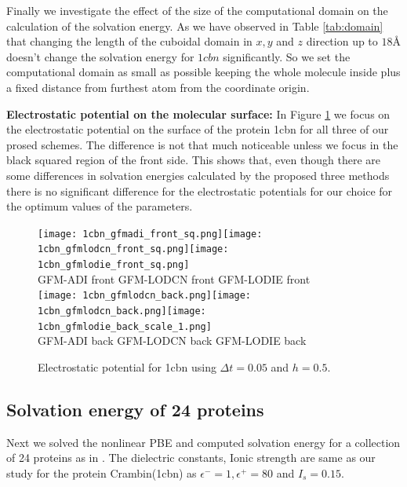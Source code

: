 Finally we investigate the effect of the size of the computational domain on the calculation of the solvation energy. As we have observed in Table \ref{tab:domain} that changing the length of the cuboidal domain in $x,y$ and $z$ direction up to $18$\r{A} doesn't change the solvation energy for $1cbn$ significantly. So we set the computational domain as small as possible keeping the whole molecule inside plus a fixed distance from furthest atom from the coordinate origin.   


{\bf Electrostatic potential on the molecular surface:} In Figure \ref{fig_1cbn} we focus on the electrostatic potential on the surface of the protein 1cbn for all three of our prosed schemes.  The difference is not that much noticeable unless we focus in the black squared region of the front side. This shows that, even though there are some differences in solvation energies calculated by the proposed three methods there is no significant difference for the electrostatic potentials for our choice for the optimum values of the parameters.    

\begin{figure}[!ht]
\begin{center}	
	\texttt{[image: 1cbn\_gfmadi\_front\_sq.png]}\texttt{[image: 1cbn\_gfmlodcn\_front\_sq.png]}\texttt{[image: 1cbn\_gfmlodie\_front\_sq.png]}\\
GFM-ADI front \hskip 0.7in GFM-LODCN front \hskip 0.7in GFM-LODIE front\\
	\texttt{[image: 1cbn\_gfmlodcn\_back.png]}\texttt{[image: 1cbn\_gfmlodcn\_back.png]}\texttt{[image: 1cbn\_gfmlodie\_back\_scale\_1.png]}\\
  GFM-ADI back \hskip 0.7in GFM-LODCN back \hskip 0.7in GFM-LODIE back\\
	\caption{Electrostatic potential for 1cbn using $\Delta t = 0.05$ and $h= 0.5$. }
\label{fig_1cbn}
\end{center}
\end{figure}



\subsection{Solvation energy of 24 proteins}
Next we solved the nonlinear PBE and computed solvation energy for a collection of 24 proteins as in \cite{Geng2007,Geng2017a}. The dielectric constants, Ionic strength are same as our study for the protein Crambin(1cbn) as $\epsilon^-=1, \epsilon^+=80$ and $I_s = 0.15$.
 

